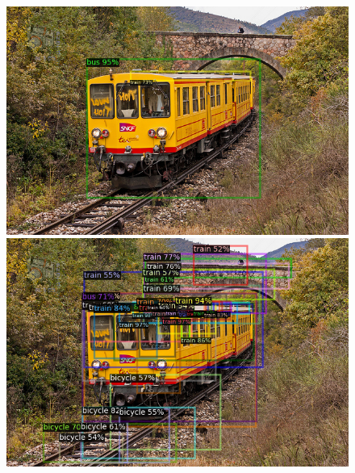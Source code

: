 \documentclass{article}
\begin{document}
\begin{figure}[h!]
  \centering
  \begin{minipage}{0.33\textwidth}
  \includegraphics[width=\textwidth, height=0.17\textheight]{./../../final_results/Coco/COCO_test2014_000000006499_1shot.png}
  \end{minipage}
  \begin{minipage}{0.33\textwidth}
  \includegraphics[width=\textwidth, height=0.17\textheight]{./../../final_results/Coco/COCO_test2014_000000006499_5shot.png}
  \end{minipage}
  \begin{minipage}{0.31\textwidth}

\end{minipage}
\end{figure}
\end{document}
